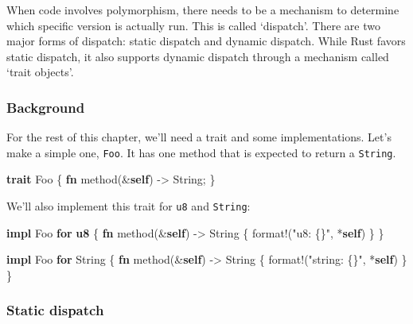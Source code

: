 \documentclass[a4paper,]{book}
\newenvironment{Shaded}{\begin{snugshade}}{\end{snugshade}}
\newcommand{\KeywordTok}[1]{\textcolor[rgb]{0.13,0.29,0.53}{\textbf{{#1}}}}
\newcommand{\StringTok}[1]{\textcolor[rgb]{0.31,0.60,0.02}{{#1}}}
\newcommand{\OtherTok}[1]{\textcolor[rgb]{0.56,0.35,0.01}{{#1}}}
\newcommand{\NormalTok}[1]{{#1}}
\begin{document}

When code involves polymorphism, there needs to be a mechanism to
determine which specific version is actually run. This is called
`dispatch'. There are two major forms of dispatch: static dispatch and
dynamic dispatch. While Rust favors static dispatch, it also supports
dynamic dispatch through a mechanism called `trait objects'.

\subsubsection{Background}\label{background}

For the rest of this chapter, we'll need a trait and some
implementations. Let's make a simple one, \texttt{Foo}. It has one
method that is expected to return a \texttt{String}.

\begin{Shaded}
\begin{Highlighting}[]
\KeywordTok{trait} \NormalTok{Foo \{}
    \KeywordTok{fn} \NormalTok{method(&}\KeywordTok{self}\NormalTok{) -> String;}
\NormalTok{\}}
\end{Highlighting}
\end{Shaded}

We'll also implement this trait for \texttt{u8} and \texttt{String}:

\begin{Shaded}
\begin{Highlighting}[]
\KeywordTok{impl} \NormalTok{Foo }\KeywordTok{for} \KeywordTok{u8} \NormalTok{\{}
    \KeywordTok{fn} \NormalTok{method(&}\KeywordTok{self}\NormalTok{) -> String \{ }\OtherTok{format!}\NormalTok{(}\StringTok{"u8: \{\}"}\NormalTok{, *}\KeywordTok{self}\NormalTok{) \}}
\NormalTok{\}}

\KeywordTok{impl} \NormalTok{Foo }\KeywordTok{for} \NormalTok{String \{}
    \KeywordTok{fn} \NormalTok{method(&}\KeywordTok{self}\NormalTok{) -> String \{ }\OtherTok{format!}\NormalTok{(}\StringTok{"string: \{\}"}\NormalTok{, *}\KeywordTok{self}\NormalTok{) \}}
\NormalTok{\}}
\end{Highlighting}
\end{Shaded}

\subsubsection{Static dispatch}\label{static-dispatch}
\end{document}
